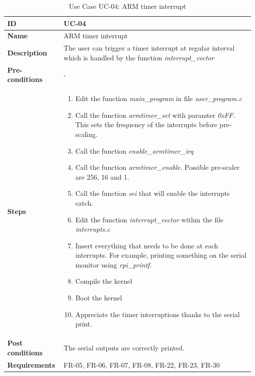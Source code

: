 \begin{table}[H]
    \centering
    \begin{tabular}{| p{3cm} | p{7cm} |}
    \hline
    \textbf{ID}             & UC-04 \\ \hline
    \textbf{Name}           & ARM timer interrupt \\ \hline
    \textbf{Description}    & The user can trigger a timer interrupt at regular interval which is handled by the function \textit{interrupt\_vector}
	\\ \hline
    \textbf{Pre-conditions} & - \\ \hline
    \textbf{Steps}          &   \begin{enumerate}
                                    \item Edit the function \textit{main\_program} in file \textit{user\_program.c}
                                    \item Call the function \textit{armtimer\_set} with paramter \textit{0xFF}. This sets the frequency of the interrupts before pre-scaling.
                                    \item Call the function \textit{enable\_armtimer\_irq} 
                                    \item Call the function \textit{armtimer\_enable}. Possible pre-scaler are 256, 16 and 1.
                                    \item Call the function \textit{sei} that will enable the interrupts catch.
                                    \item Edit the function \textit{interrupt\_vector} within the file \textit{interrupts.c}
                                    \item Insert everything that needs to be done at each interrupts. For example, printing something on the serial monitor using \textit{rpi\_printf}.
                                    \item Compile the kernel
                                    \item Boot the kernel
                                    \item Appreciate the timer interruptions thanks to the serial print.
                                \end{enumerate}
 \\ \hline
    \textbf{Post conditions} & The serial outputs are correctly printed. \\ \hline
    \textbf{Requirements}       &  FR-05, FR-06, FR-07, FR-08, FR-22, FR-23, FR-30 \\ \hline
    \end{tabular}
    \caption{Use Case UC-04: ARM timer interrupt}
\end{table}



